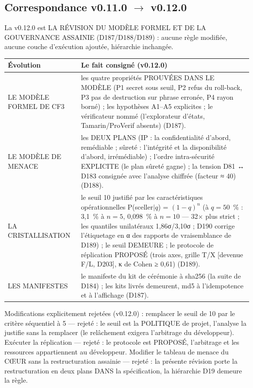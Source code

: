\subsection{Correspondance v0.11.0 $\to$ v0.12.0}\label{sec:evolutions120}

La v0.12.0 est LA RÉVISION DU MODÈLE FORMEL ET DE LA GOUVERNANCE
ASSAINIE (D187/D188/D189) : aucune règle modifiée, aucune couche
d'exécution ajoutée, hiérarchie inchangée.

\begin{table}[tbp]
\centering
\small
\begin{tabularx}{\textwidth}{>{\raggedright\arraybackslash}p{3.4cm} X}
\textbf{Évolution} & \textbf{Le fait consigné (v0.12.0)} \\
\midrule
LE MODÈLE FORMEL DE CF3 & les quatre propriétés PROUVÉES DANS LE MODÈLE
(P1 secret sous seuil, P2 refus du roll-back, P3 pas de destruction sur
phrase erronée, P4 rayon borné) ; les hypothèses A1--A5 explicites ; le
vérificateur nommé (l'explorateur d'états, Tamarin/ProVerif absents)
(D187). \\
LE MODÈLE DE MENACE & les DEUX PLANS (IP : la confidentialité d'abord,
remédiable ; sûreté : l'intégrité et la disponibilité d'abord,
irrémédiable) ; l'ordre intra-sécurité EXPLICITE (le plan sûreté gagne) ;
la tension D81 ↔ D183 consignée avec l'analyse chiffrée (facteur ≈ 40)
(D188). \\
LA CRISTALLISATION & le seuil 10 justifié par les caractéristiques
opérationnelles P(sceller$|q$) = $(1-q)^n$ (à $q = 50$~\% : 3,1~\%
à $n{=}5$, 0,098~\% à $n{=}10$ — 32× plus strict ; les quantiles
unilatéraux 1,86σ/3,10σ ; D190 corrige l'étiquetage en α des rapports
de vraisemblance de D189) ; le seuil DEMEURE ; le
protocole de réplication PROPOSÉ (trois axes, grille T/X [devenue
F/L, D203], κ de Cohen ≥
0,61) (D189). \\
LES MANIFESTES & le manifeste du kit de cérémonie à sha256 (la suite de
D184) ; les kits livrés demeurent, md5 à l'idempotence et à l'affichage
(D187). \\
\end{tabularx}
\end{table}

Modifications explicitement rejetées (v0.12.0) : remplacer le seuil de
10 par le critère séquentiel à 5 — rejeté : le seuil est la POLITIQUE de
projet, l'analyse la justifie sans la remplacer (le relâchement exigera
l'arbitrage du développeur). Exécuter la réplication — rejeté : le
protocole est PROPOSÉ, l'arbitrage et les ressources appartiennent au
développeur. Modifier le tableau de menace du CŒUR sans la restructuration
assainie — rejeté : la présente révision porte la restructuration en deux
plans DANS la spécification, la hiérarchie D19 demeure la règle.

